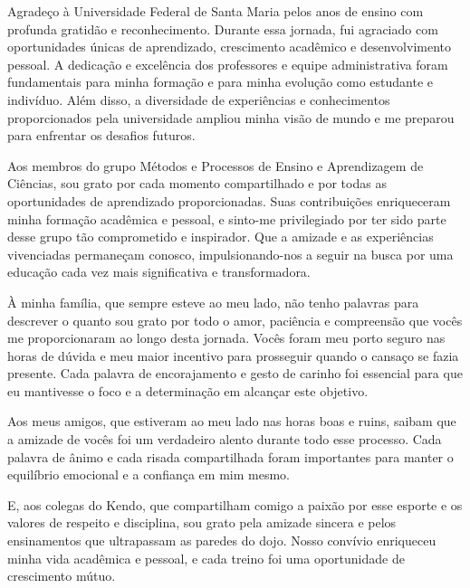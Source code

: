 \begin{agradecimentos}[AGRADECIMENTOS]

Agradeço à Universidade Federal de Santa Maria pelos anos de ensino com profunda gratidão e reconhecimento. Durante essa jornada, fui agraciado com oportunidades únicas de aprendizado, crescimento acadêmico e desenvolvimento pessoal. A dedicação e excelência dos professores e equipe administrativa foram fundamentais para minha formação e para minha evolução como estudante e indivíduo. Além disso, a diversidade de experiências e conhecimentos proporcionados pela universidade ampliou minha visão de mundo e me preparou para enfrentar os desafios futuros. 

Aos membros do grupo Métodos e Processos de Ensino e Aprendizagem de Ciências, sou grato por cada momento compartilhado e por todas as oportunidades de aprendizado proporcionadas. Suas contribuições enriqueceram minha formação acadêmica e pessoal, e sinto-me privilegiado por ter sido parte desse grupo tão comprometido e inspirador. Que a amizade e as experiências vivenciadas permaneçam conosco, impulsionando-nos a seguir na busca por uma educação cada vez mais significativa e transformadora.

À minha família, que sempre esteve ao meu lado, não tenho palavras para descrever o quanto sou grato por todo o amor, paciência e compreensão que vocês me proporcionaram ao longo desta jornada. Vocês foram meu porto seguro nas horas de dúvida e meu maior incentivo para prosseguir quando o cansaço se fazia presente. Cada palavra de encorajamento e gesto de carinho foi essencial para que eu mantivesse o foco e a determinação em alcançar este objetivo.

Aos meus amigos, que estiveram ao meu lado nas horas boas e ruins, saibam que a amizade de vocês foi um verdadeiro alento durante todo esse processo. Cada palavra de ânimo e cada risada compartilhada foram importantes para manter o equilíbrio emocional e a confiança em mim mesmo.

E, aos colegas do Kendo, que compartilham comigo a paixão por esse esporte e os valores de respeito e disciplina, sou grato pela amizade sincera e pelos ensinamentos que ultrapassam as paredes do dojo. Nosso convívio enriqueceu minha vida acadêmica e pessoal, e cada treino foi uma oportunidade de crescimento mútuo.

\end{agradecimentos}